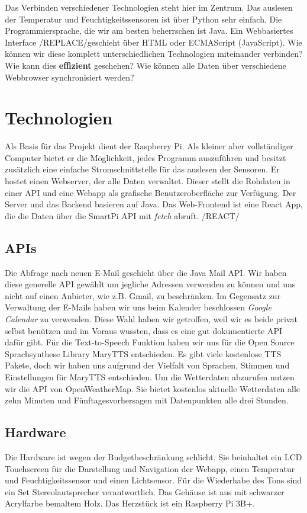 \documentclass[11pt,a4paper]{article}
\begin{document}
Das Verbinden verschiedener Technologien steht hier im Zentrum. Das auslesen der Temperatur und Feuchtigkeitssensoren ist über Python sehr einfach. Die Programmiersprache, die wir am besten beherrschen ist Java. Ein Webbasiertes Interface /REPLACE/geschieht über HTML oder ECMAScript (JavaScript). Wie können wir diese komplett unterschiedlichen Technologien miteinander verbinden? Wie kann dies \textbf{effizient} geschehen? Wie können alle Daten über verschiedene Webbrowser synchronisiert werden?

\section{Technologien}
Als Basis für das Projekt dient der Raspberry Pi. Als kleiner aber vollständiger Computer bietet er die Möglichkeit, jedes Programm auszuführen und besitzt zusätzlich eine einfache Stromschnittstelle für das auslesen der Sensoren. Er hostet einen Webserver, der alle Daten verwaltet. Dieser stellt die Rohdaten in einer API und eine Webapp als grafische Benutzeroberfläche zur Verfügung. Der Server und das Backend basieren auf Java. Das Web-Frontend ist eine React App, die die Daten über die SmartPi API mit \textit{fetch} abruft. /REACT/

\subsection{APIs}
Die Abfrage nach neuen E-Mail geschieht über die Java Mail API. Wir haben diese generelle API gewählt um jegliche Adressen verwenden zu können und uns nicht auf einen Anbieter, wie z.B. Gmail, zu beschr\"anken. Im Gegensatz zur Verwaltung der E-Mails haben wir uns beim Kalender beschlossen \textit{Google Calendar} zu verwenden. Diese Wahl haben wir getroffen, weil wir es beide privat selbst  ben\"utzen und im Voraus wussten, dass es eine gut dokumentierte API dafür gibt. Für die Text-to-Speech Funktion haben wir uns für die Open Source Sprachsynthese Library MaryTTS entschieden. Es gibt viele kostenlose TTS Pakete, doch wir haben uns aufgrund der Vielfalt von Sprachen, Stimmen und Einstellungen für MaryTTS entschieden. Um die Wetterdaten abzurufen nutzen wir die API von OpenWeatherMap. Sie bietet kostenlos aktuelle Wetterdaten alle zehn Minuten und Fünftagesvorhersagen mit Datenpunkten alle drei Stunden.

\subsection{Hardware}
Die Hardware ist wegen der Budgetbeschränkung schlicht. Sie beinhaltet ein LCD Touchscreen für die Darstellung und Navigation der Webapp, einen Temperatur und Feuchtigkeitssensor und einen Lichtsensor. Für die Wiederhabe des Tons sind ein Set Stereolautsprecher verantwortlich. Das Gehäuse ist aus mit schwarzer Acrylfarbe bemaltem Holz. Das Herzstück ist ein Raspberry Pi 3B+.
\end{document}
